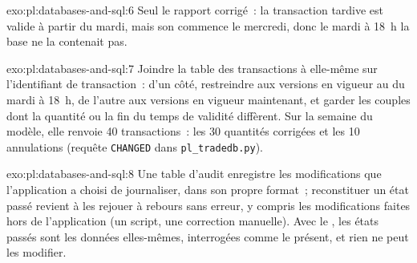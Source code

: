 \begin{solution}{exo:pl:databases-and-sql:6}
Seul le rapport corrigé~: la transaction tardive est valide à partir du mardi, mais son  commence le mercredi, donc le mardi à 18~h la base
ne la contenait pas.
\end{solution}

\begin{solution}{exo:pl:databases-and-sql:7}
Joindre la table des transactions à elle-même sur l'identifiant de transaction~: d'un côté, restreindre aux versions en vigueur au  du mardi à 18~h, de l'autre
aux versions en vigueur maintenant, et garder les couples dont la quantité ou la fin du temps de validité diffèrent. Sur la semaine du modèle, elle renvoie 40 transactions~: les 30 quantités corrigées
et les 10 annulations (requête \texttt{CHANGED} dans \texttt{pl\_tradedb.py}).
\end{solution}

\begin{solution}{exo:pl:databases-and-sql:8}
Une table d'audit enregistre les modifications que l'application a choisi de journaliser, dans son propre format~; reconstituer un état passé revient à les rejouer à rebours
sans erreur, y compris les modifications faites hors de l'application (un script, une correction manuelle). Avec le , les états passés sont les données
elles-mêmes, interrogées comme le présent, et rien ne peut les modifier.
\end{solution}

